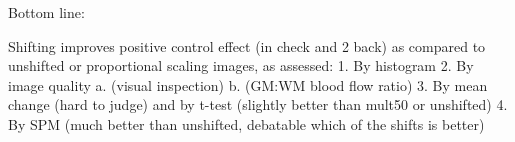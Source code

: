 Bottom line:

Shifting improves positive control effect (in check and 2 back) as compared to unshifted or proportional scaling images, as assessed:
1. By histogram
2. By image quality 
a. (visual inspection) 
b. (GM:WM blood flow ratio)
3. By mean change (hard to judge) and by t-test (slightly better than mult50 or unshifted)
4. By SPM  (much better than unshifted, debatable which of the shifts is better)
